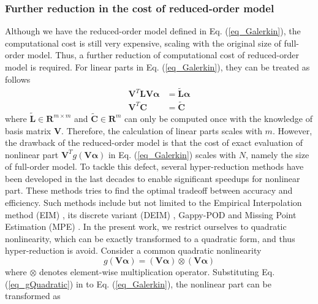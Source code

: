 \documentclass[preprint, 10pt]{elsarticle}
\begin{document}
\subsubsection{Further reduction in the cost of reduced-order model}
Although we have the reduced-order model defined in Eq. (\ref{eq_Galerkin}), the computational cost is still very expensive, scaling with the original size of full-order model. Thus, a further reduction of computational cost of reduced-order model is required. For linear parts in Eq. (\ref{eq_Galerkin}), they can be treated as follows
\begin{equation}
\begin{aligned}
\mathbf{V}^T \mathbf{L} \mathbf{V} \pmb{\alpha}  &= \tilde {\mathbf{L}} \pmb{\alpha} \\
\mathbf{V}^T \mathbf{C}                          &= \tilde {\mathbf{C}}
\end{aligned}
\label{eq_ReductionLinear}
\end{equation}
where $\tilde {\mathbf{L}} \in \mathbf{R}^{m \times m}$ and $\tilde {\mathbf{C}} \in \mathbf{R}^{m} $ can only be computed once with the knowledge of basis matrix $\mathbf{V}$.
Therefore, the calculation of linear parts scales with $m$. However, the drawback of the reduced-order model is that the cost of exact evaluation of nonlinear part $\mathbf{V}^T g \left( \mathbf{V} \pmb{\alpha} \right)$  in Eq. (\ref{eq_Galerkin}) scales with $N$, namely the size of full-order model. To tackle this defect, several hyper-reduction methods have been developed in the last decades to enable significant speedups for nonlinear part. These methods tries to find the optimal tradeoff between accuracy and efficiency. Such methods include but not limited to the Empirical Interpolation method (EIM) \cite{barrault2004empirical}, its
discrete variant (DEIM) \cite{chaturantabut2010nonlinear}, Gappy-POD \cite{everson1995karhunen}and Missing Point Estimation (MPE) \cite{astrid2008missing}. In the present work, we restrict ourselves to quadratic nonlinearity, which can be exactly transformed to a quadratic form, and thus hyper-reduction is avoid. Consider a common quadratic nonlinearity
\begin{equation}
g \left( \mathbf{V} \pmb{\alpha} \right)
=
\left( \mathbf{V} \pmb{\alpha} \right) \otimes \left( \mathbf{V} \pmb{\alpha} \right)
\label{eq_gQuadratic}
\end{equation}
where $\otimes$ denotes element-wise multiplication operator. Substituting Eq. (\ref{eq_gQuadratic}) in to Eq. (\ref{eq_Galerkin}), the nonlinear part can be transformed as
\end{document}
